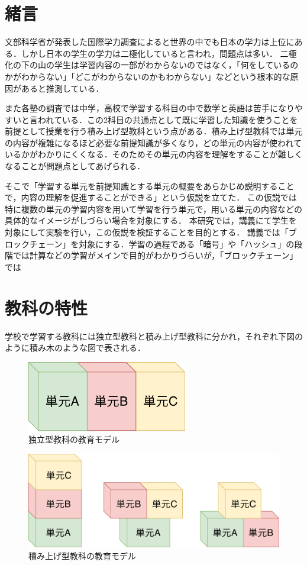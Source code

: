 \documentclass[a4j,12pt]{jsarticle}
\begin{document}

\semi

\section{緒言}
文部科学省が発表した国際学力調査によると世界の中でも日本の学力は上位にある．しかし日本の学生の学力は二極化していると言われ，問題点は多い．
二極化の下の山の学生は学習内容の一部がわからないのではなく，「何をしているのかがわからない」「どこがわからないのかもわからない」などという根本的な原因があると推測している．

また各塾の調査では中学，高校で学習する科目の中で数学と英語は苦手になりやすいと言われている．この2科目の共通点として既に学習した知識を使うことを前提として授業を行う積み上げ型教科という点がある．積み上げ型教科では単元の内容が複雑になるほど必要な前提知識が多くなり，どの単元の内容が使われているかがわかりにくくなる．そのためその単元の内容を理解をすることが難しくなることが問題点としてあげられる．

そこで「学習する単元を前提知識とする単元の概要をあらかじめ説明することで，内容の理解を促進することができる」という仮説を立てた．
この仮説では特に複数の単元の学習内容を用いて学習を行う単元で，用いる単元の内容などの具体的なイメージがしづらい場合を対象にする．
本研究では，講義にて学生を対象にして実験を行い，この仮説を検証することを目的とする．
講義では「ブロックチェーン」を対象にする．学習の過程である「暗号」や「ハッシュ」の段階では計算などの学習がメインで目的がわかりづらいが，「ブロックチェーン」では

\newpage
\section{教科の特性}
学校で学習する教科には独立型教科と積み上げ型教科に分かれ，それぞれ下図のように積み木のような図で表される．

\begin{figure}[H]
\centering
\includegraphics[width=7cm]{02.pdf}
\caption{独立型教科の教育モデル}
\label{fig:02}
\end{figure} 

\begin{figure}[H]
\centering
\includegraphics[width=12cm]{03.pdf}
\caption{積み上げ型教科の教育モデル}
\label{fig:03}
\end{figure} 
\end{document}
